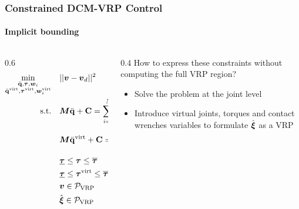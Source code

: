 \documentclass[10pt]{beamer}
\begin{document}
\begin{frame}
  \frametitle{Constrained DCM-VRP Control}
  \framesubtitle{Implicit bounding}
  \centering
  \begin{columns}
    \begin{column}{0.6\textwidth}
      \begin{align}
        \min_{\substack{\ddot{\mathbf{q}}, \boldsymbol{\tau}, \boldsymbol{w}_i \\
        \ddot{\mathbf{q}}^{\text{virt}}, \boldsymbol{\tau}^{\text{virt}}, \boldsymbol{w}_i^{\text{virt}}}}
        \quad & ||\boldsymbol{v} - \boldsymbol{v}_{d}||^2  \label{Eq:DCM bounding objective} \\
        \textrm{s.t.} \quad & \boldsymbol{M}\ddot{\mathbf{q}} + \textbf{C} = \sum_{i =
        1}^{N}{\boldsymbol{J}_{i}}^\top\boldsymbol{w}_i + {\boldsymbol{S}}^\top\boldsymbol{\tau} \\
        & \boldsymbol{M}\ddot{\mathbf{q}}^{\text{virt}} + \textbf{C} = \sum_{i =
        1}^{N}{\boldsymbol{J}_{i}}^\top\boldsymbol{w}_i^{\text{virt}} + {\boldsymbol{S}}^\top\boldsymbol{\tau}^{\text{virt}}\\
        & \underline{\boldsymbol{\tau}} \leq \boldsymbol{\tau} \leq \overline{\boldsymbol{\tau}} \\
        & \underline{\boldsymbol{\tau}} \leq \boldsymbol{\tau}^{\text{virt}} \leq \overline{\boldsymbol{\tau}} \\
        & \boldsymbol{v} \in \cal{P}_\text{VRP} \label{Eq:DCM bounding VRP constraint} \\
        & \hat{\boldsymbol{\xi}} \in \cal{P}_\text{VRP} \label{Eq:DCM bounding dotDCM constraint}
      \end{align}
    \end{column}
    \begin{column}{0.4\textwidth}
      How to express these constraints without computing the full VRP region?
      \vfill
      \begin{itemize}
        \item Solve the problem at the joint level
        \item Introduce virtual joints, torques and contact wrenches variables to formulate $\hat{\boldsymbol{\xi}}$ as a VRP
      \end{itemize}
    \end{column}
  \end{columns}
\end{frame}
\end{document}
